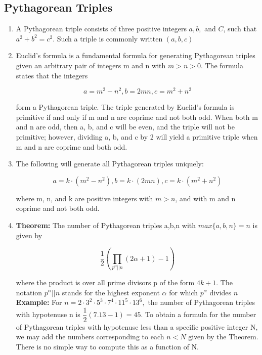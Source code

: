 \subsection{Pythagorean Triples}
\begin{enumerate}
\item A Pythagorean triple consists of three positive integers $\displaystyle a, b,$ and $\displaystyle C$, such that $\displaystyle a^{2}+b^{2}=c^{2}$. Such a triple is commonly written $\displaystyle (a, b, c)$
\item Euclid's formula is a fundamental formula for generating Pythagorean triples given an arbitrary pair of integers m and n with $m >n >0$. The formula states that the integers  
     
     $$\displaystyle a = m^{2}-n^{2}, b = 2mn,  c = m^{2}+n^{2}$$    
     
     form a Pythagorean triple. The triple generated by Euclid's formula is primitive if and only if m and n are coprime and not both odd. When both m and n are odd, then a, b, and c will be even, and the triple will not be primitive; however, dividing a, b, and c by 2 will yield a primitive triple when m and n  are coprime and both odd.
\item The following will generate all Pythagorean triples uniquely:  
     
     $$\displaystyle a = k\cdot \left( m^{2}-n^{2}\right), b = k\cdot\left(2mn\right),  c = k\cdot \left(m^{2}+n^{2}\right)$$  

     where m, n, and k are positive integers with $m > n$, and with m and n coprime and not both odd.  
\item \textbf{Theorem:}
     The number of Pythagorean triples
     {a,b,n} with $max\{a,b,n\} = n$ is given by  

     $$\displaystyle \dfrac{1}{2}\left( \displaystyle\prod _{ p^{\alpha} || n}\left( 2\alpha +1\right) -1\right)$$  

     where the product is over all prime divisors p of the form $4k+1$.  
     The notation $\displaystyle p^{\alpha} || n$ stands for the highest exponent $\displaystyle \alpha$ for which $\displaystyle p^{\alpha}$ divides $n$  
     \textbf{Example:}
     For $n = 2\cdot3^{2}\cdot5^{3}\cdot7^{4}\cdot11^{5}\cdot13^{6},$ the number of Pythagorean triples with hypotenuse n is $\displaystyle \dfrac{1}{2}\left( 7.13-1\right) =45$.  
     To obtain a formula for the number of Pythagorean triples with hypotenuse less than a specific positive integer N, we may add the numbers corresponding to each $n < N$ given by the Theorem. There is no simple way to compute this as a function of N.
\end{enumerate}

